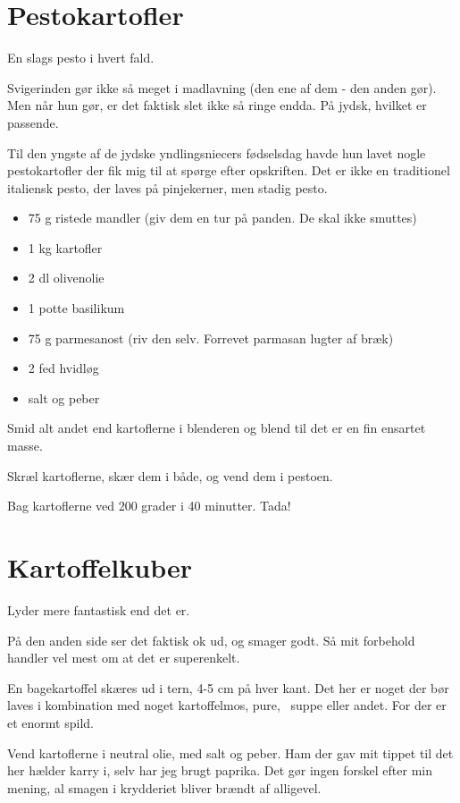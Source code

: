 \documentclass[
]{book}
\providecommand{\tightlist}{%
  \setlength{\itemsep}{0pt}\setlength{\parskip}{0pt}}
\begin{document}
\hypertarget{pestokartofler}{%
\section{Pestokartofler}\label{pestokartofler}}

En slags pesto i hvert fald.

Svigerinden gør ikke så meget i madlavning (den ene af dem - den anden gør). Men når hun gør, er det faktisk slet ikke så ringe endda. På jydsk, hvilket er passende.

Til den yngste af de jydske yndlingsniecers fødselsdag havde hun lavet nogle pestokartofler der fik mig til at spørge efter opskriften. Det er ikke en traditionel italiensk pesto, der laves på pinjekerner, men stadig pesto.

\begin{itemize}
\tightlist
\item
  75 g ristede mandler (giv dem en tur på panden. De skal ikke smuttes)
\item
  1 kg kartofler
\item
  2 dl olivenolie
\item
  1 potte basilikum
\item
  75 g parmesanost (riv den selv. Forrevet parmasan lugter af bræk)
\item
  2 fed hvidløg
\item
  salt og peber
\end{itemize}

Smid alt andet end kartoflerne i blenderen og blend til det er en fin ensartet masse.

Skræl kartoflerne, skær dem i både, og vend dem i pestoen.

Bag kartoflerne ved 200 grader i 40 minutter. Tada!

\hypertarget{kartoffelkuber}{%
\section{Kartoffelkuber}\label{kartoffelkuber}}

Lyder mere fantastisk end det er.

På den anden side ser det faktisk ok ud, og smager godt. Så mit forbehold handler vel mest om at det er superenkelt.

En bagekartoffel skæres ud i tern, 4-5 cm på hver kant. Det her er noget der bør laves i kombination med noget kartoffelmos, pure,~ suppe eller andet. For der er et enormt spild.

Vend kartoflerne i neutral olie, med salt og peber. Ham der gav mit tippet til det her hælder karry i, selv har jeg brugt paprika. Det gør ingen forskel efter min mening, al smagen i krydderiet bliver brændt af alligevel.
\end{document}
